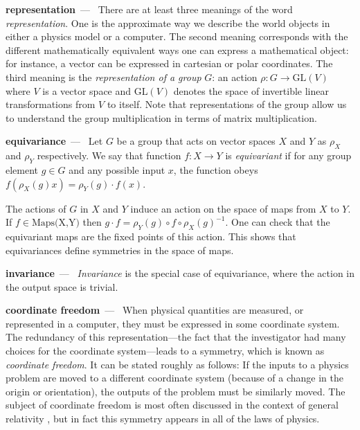 \documentclass{article}
\renewcommand{\paragraph}[1]{\par\textbf{#1}~---~}
\begin{document}
\paragraph{representation} There are at least three meanings of the word \emph{representation}. One is the approximate way we describe the world objects in either a physics model or a computer. The second meaning corresponds with the different mathematically equivalent ways one can express a mathematical object: for instance, a vector can be expressed in cartesian or polar coordinates. The third meaning is the \emph{representation of a group} $G$: an action $\rho: G\to \text{GL}(V)$ where $V$ is a vector space and $\text{GL}(V)$ denotes the space of invertible linear transformations from $V$ to itself. Note that representations of the group allow us to understand the group multiplication in terms of matrix multiplication.

\paragraph{equivariance}
Let $G$ be a group that acts on vector spaces $X$ and $Y$ as $\rho_X$ and $\rho_Y$ respectively. We say that function $f:X\to Y$ is \emph{equivariant} if for any group element $g\in G$ and any possible input $x$, the function obeys $f( \rho_X(g) x) = \rho_Y(g)\cdot f(x)$.

The actions of $G$ in $X$ and $Y$ induce an action on the space of maps from $X$ to $Y$. If $f\in \text{Maps(X,Y)}$ then $g\cdot f = \rho_Y(g)\circ f \circ \rho_X(g)^{-1}$. One can check that the equivariant maps are the fixed points of this action. This shows that equivariances define symmetries in the space of maps. 

\paragraph{invariance}
\emph{Invariance} is the special case of equivariance, where the action in the output space is trivial.

\paragraph{coordinate freedom}
When physical quantities are measured, or represented in a computer, they must be expressed in some coordinate system.
The redundancy of this representation---the fact that the investigator had many choices for the coordinate system---leads to a symmetry, which is known as \emph{coordinate freedom}.
It can be stated roughly as follows:
If the inputs to a physics problem are moved to a different coordinate system (because of a change in the origin or orientation), the outputs of the problem must be similarly moved.
The subject of coordinate freedom is most often discussed in the context of general relativity \cite{gr}, but in fact this symmetry appears in all of the laws of physics.
\end{document}
